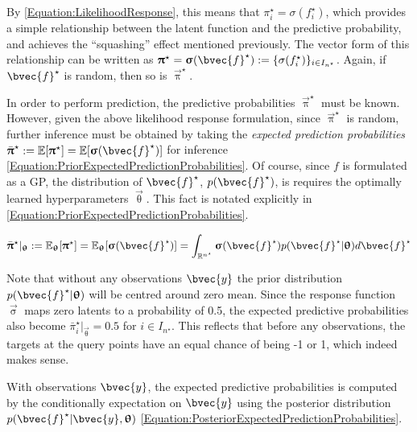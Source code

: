 			By \eqref{Equation:LikelihoodResponse}, this means that $\pi^{\star}_{i} = \sigma(f^{\star}_{i})$, which provides a simple relationship between the latent function and the predictive probability, and achieves the ``squashing'' effect mentioned previously. The vector form of this relationship can be written as $\vec{\uppi}^{\star} = \vec{\upsigma}(\bvec{f}^{\star}) := \{\sigma(f^{\star}_{i})\}_{i \in I_{n^{\star}}}$. Again, if $\bvec{f}^{\star}$ is random, then so is $\vec{\uppi}^{\star}$.
			
			In order to perform prediction, the predictive probabilities $\vec{\uppi}^{\star}$ must be known. However, given the above likelihood response formulation, since $\vec{\uppi}^{\star}$ is random, further inference must be obtained by taking the \textit{expected prediction probabilities} $\bar{\vec{\uppi}}^{\star} := \mathbb{E}[\vec{\uppi}^{\star}] = \mathbb{E}[\vec{\upsigma}(\bvec{f}^{\star})]$ for inference \eqref{Equation:PriorExpectedPredictionProbabilities}. Of course, since $f$ is formulated as a GP, the distribution of $\bvec{f}^{\star}$, $p(\bvec{f}^{\star})$, is requires the optimally learned hyperparameters $\vec{\uptheta}$. This fact is notated explicitly in \eqref{Equation:PriorExpectedPredictionProbabilities}.
			
			\begin{equation}
				\bar{\vec{\uppi}}^{\star} |_{\vec{\uptheta}} := \mathbb{E}_{\vec{\uptheta}}[\vec{\uppi}^{\star}] = \mathbb{E}_{\vec{\uptheta}}[\vec{\upsigma}(\bvec{f}^{\star})] = \int_{\mathbb{R}^{n^{\star}}} \vec{\upsigma}(\bvec{f}^{\star}) p(\bvec{f}^{\star} | \vec{\uptheta}) d \bvec{f}^{\star}
			\label{Equation:PriorExpectedPredictionProbabilities}
			\end{equation}	
			
			 Note that without any observations $\bvec{y}$ the prior distribution $p(\bvec{f}^{\star} | \vec{\uptheta})$ will be centred around zero mean. Since the response function $\vec{\upsigma}$ maps zero latents to a probability of 0.5, the expected predictive probabilities also become $\bar{\pi}^{\star}_{i} |_{\vec{\uptheta}} = 0.5$ for $i \in I_{n^{\star}}$. This reflects that before any observations, the targets at the query points have an equal chance of being -1 or 1, which indeed makes sense.
			 
			 With observations $\bvec{y}$, the expected predictive probabilities is computed by the conditionally expectation on $\bvec{y}$ using the posterior distribution $p(\bvec{f}^{\star} | \bvec{y}, \vec{\uptheta})$ \eqref{Equation:PosteriorExpectedPredictionProbabilities}.
	
